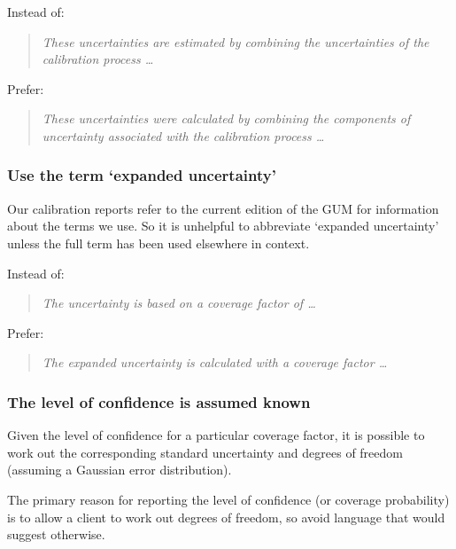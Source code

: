 Instead of:

\vspace{-\baselineskip}\begin{quote}\textit{
These uncertainties are estimated by combining the uncertainties of the calibration process \ldots}
\end{quote} 
\vspace{-\baselineskip}Prefer:

\vspace{-\baselineskip}\begin{quote}\textit{
These uncertainties were calculated by combining the components of uncertainty associated with the calibration process \ldots} 
\end{quote}

\subsubsection{Use the term `expanded uncertainty'}
Our calibration reports refer to the current edition of the GUM for information about the terms we use. So it is unhelpful to abbreviate `expanded uncertainty' unless the full term has been used elsewhere in context. 

Instead of:

\vspace{-\baselineskip}\begin{quote}\textit{
The uncertainty is based on a coverage factor of \ldots}
\end{quote} 
\vspace{-\baselineskip}Prefer:

\vspace{-\baselineskip}\begin{quote}\textit{
The expanded uncertainty is calculated with a coverage factor \ldots} 
\end{quote}

\subsubsection{The level of confidence is assumed known}
Given the level of confidence for a particular coverage factor, it is possible to work out the corresponding standard uncertainty and degrees of freedom (assuming a Gaussian error distribution).
 
The primary reason for reporting the level of confidence (or coverage probability) is to allow a client to work out degrees of freedom, so avoid language that would suggest otherwise. 

